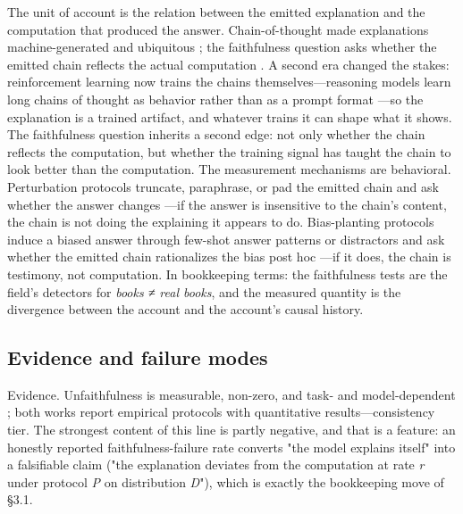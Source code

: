 \documentclass[11pt,a4paper]{article}
\begin{document}
The unit of account is the relation between the emitted explanation and the computation that produced the answer. Chain-of-thought made explanations machine-generated and ubiquitous \cite{key01}; the faithfulness question asks whether the emitted chain reflects the actual computation \cite{key02,key03}. A second era changed the stakes: reinforcement learning now trains the chains themselves—reasoning models learn long chains of thought as behavior rather than as a prompt format \cite{key29}—so the explanation is a trained artifact, and whatever trains it can shape what it shows. The faithfulness question inherits a second edge: not only whether the chain reflects the computation, but whether the training signal has taught the chain to look better than the computation. The measurement mechanisms are behavioral. Perturbation protocols truncate, paraphrase, or pad the emitted chain and ask whether the answer changes \cite{key03}—if the answer is insensitive to the chain's content, the chain is not doing the explaining it appears to do. Bias-planting protocols induce a biased answer through few-shot answer patterns or distractors and ask whether the emitted chain rationalizes the bias post hoc \cite{key02}—if it does, the chain is testimony, not computation. In bookkeeping terms: the faithfulness tests are the field's detectors for \textit{books ≠ real books}, and the measured quantity is the divergence between the account and the account's causal history.

\subsection{Evidence and failure modes}

Evidence. Unfaithfulness is measurable, non-zero, and task- and model-dependent \cite{key02,key03}; both works report empirical protocols with quantitative results—consistency tier. The strongest content of this line is partly negative, and that is a feature: an honestly reported faithfulness-failure rate converts "the model explains itself" into a falsifiable claim ("the explanation deviates from the computation at rate \textit{r} under protocol \textit{P} on distribution \textit{D}"), which is exactly the bookkeeping move of §3.1.
\end{document}
